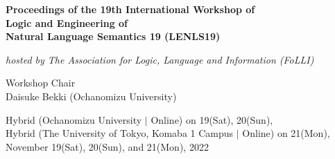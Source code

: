 \documentclass[12pt]{jarticle}
\begin{document}
\pagestyle{empty}

\vspace*{1cm}
\begin{Large}
\begin{center}
{\bf Proceedings of the 19th International Workshop of \\
     Logic and Engineering of \\Natural Language Semantics 19 (LENLS19)}
\end{center}
\end{Large}
\vspace*{1cm}
\begin{Large}
\begin{center}
{\em hosted by The Association for Logic, Language and Information (FoLLI)}
\end{center}
\end{Large}
\begin{large}
\vspace*{1cm}
\begin{center}
Workshop Chair\\ $\;$\\
Daisuke Bekki (Ochanomizu University)
\end{center}
\end{large}
\vspace*{3cm}
\vspace*{1cm}
\begin{large}
\begin{center}
Hybrid (Ochanomizu University $|$ Online) on 19(Sat), 20(Sun), \\
Hybrid (The University of Tokyo, Komaba 1 Campus $|$ Online) on 21(Mon), \\
November 19(Sat), 20(Sun), and 21(Mon), 2022
\end{center}
\end{large}
\vfill

\newpage

\vspace*{20cm}
\vfill
\begin{large}

\end{large}
\end{document}
